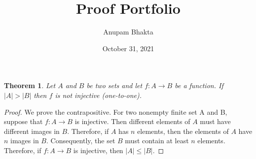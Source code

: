 \documentclass[11pt]{article}
\date{October 31, 2021}
\title{Proof Portfolio}
\author{Anupam Bhakta}
\newtheorem{theorem}{Theorem}
\begin{document}
	
\maketitle

\begin{theorem}
	Let $A$ and $B$ be two sets and let $f:A\to B$ be a function.  
	If $|A| > |B|$ then $f$ is not injective (one-to-one).	
\end{theorem}

\begin{proof}
	We prove the contrapositive. For two nonempty finite set A and B, suppose that $f:A\to B$ is injective. Then different elements of $A$ must have different images in $B$. Therefore, if $A$ has $n$ elements, then the elements of $A$ have $n$ images in $B$. Consequently, the set $B$ must contain at least $n$ elements. Therefore, if $f: A\to B$ is injective, then $|A|\le|B|$.
\end{proof}
\end{document}
